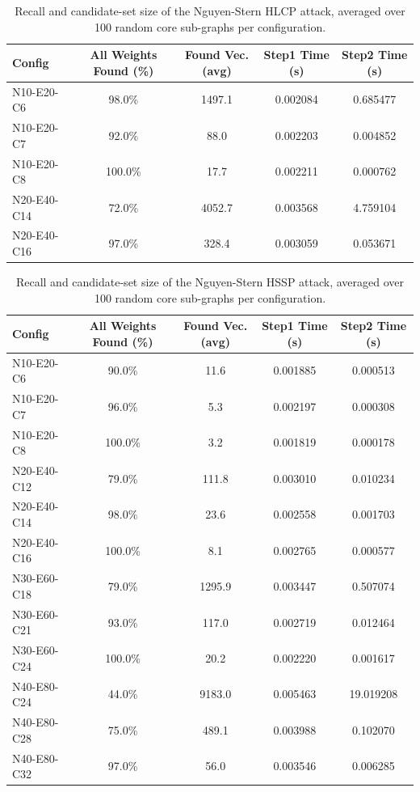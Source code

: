 \begin{table}[ht]
\centering
\begin{tabular}{l c c c c}
\hline
Config & All Weights Found (\%) & Found Vec. (avg) & Step1 Time (s) & Step2 Time (s)\\
\hline
N10-E20-C6 & 98.0\% & 1497.1 & 0.002084 & 0.685477 \\
N10-E20-C7 & 92.0\% & 88.0 & 0.002203 & 0.004852 \\
N10-E20-C8 & 100.0\% & 17.7 & 0.002211 & 0.000762 \\
N20-E40-C14 & 72.0\% & 4052.7 & 0.003568 & 4.759104 \\
N20-E40-C16 & 97.0\% & 328.4 & 0.003059 & 0.053671 \\
\hline
\end{tabular}
\caption{Recall and candidate-set size of the Nguyen-Stern HLCP attack, averaged over 100 random core sub-graphs per configuration.}
\label{tab.large_hlcp_summary}
\end{table}
\begin{table}[ht]
\centering
\begin{tabular}{l c c c c}
\hline
Config & All Weights Found (\%) & Found Vec. (avg) & Step1 Time (s) & Step2 Time (s)\\
\hline
N10-E20-C6 & 90.0\% & 11.6 & 0.001885 & 0.000513 \\
N10-E20-C7 & 96.0\% & 5.3 & 0.002197 & 0.000308 \\
N10-E20-C8 & 100.0\% & 3.2 & 0.001819 & 0.000178 \\
N20-E40-C12 & 79.0\% & 111.8 & 0.003010 & 0.010234 \\
N20-E40-C14 & 98.0\% & 23.6 & 0.002558 & 0.001703 \\
N20-E40-C16 & 100.0\% & 8.1 & 0.002765 & 0.000577 \\
N30-E60-C18 & 79.0\% & 1295.9 & 0.003447 & 0.507074 \\
N30-E60-C21 & 93.0\% & 117.0 & 0.002719 & 0.012464 \\
N30-E60-C24 & 100.0\% & 20.2 & 0.002220 & 0.001617 \\
N40-E80-C24 & 44.0\% & 9183.0 & 0.005463 & 19.019208 \\
N40-E80-C28 & 75.0\% & 489.1 & 0.003988 & 0.102070 \\
N40-E80-C32 & 97.0\% & 56.0 & 0.003546 & 0.006285 \\
\hline
\end{tabular}
\caption{Recall and candidate-set size of the Nguyen-Stern HSSP attack, averaged over 100 random core sub-graphs per configuration.}
\label{tab.large_hssp_summary}
\end{table}